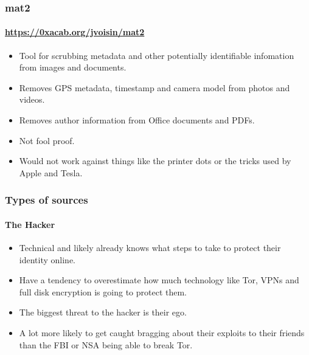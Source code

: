 \documentclass[aspectratio=169,usenames,dvipsnames]{beamer}
\begin{document}
\begin{frame}
  \frametitle{mat2}
  \framesubtitle{\url{https://0xacab.org/jvoisin/mat2}}

  \begin{itemize}[<+->]
    \item Tool for scrubbing metadata and other potentially identifiable
      infomation from images and documents.
    \item Removes GPS metadata, timestamp and camera model from photos and
      videos.
    \item Removes author information from Office documents and PDFs.
    \item Not fool proof.
    \item Would not work against things like the printer dots or the tricks
      used by Apple and Tesla.
  \end{itemize}

\end{frame}
\begin{frame}
  \frametitle{Types of sources}
  \framesubtitle{The Hacker}

  \begin{itemize}[<+->]
    \item Technical and likely already knows what steps to take to protect
      their identity online.
    \item Have a tendency to overestimate how much technology like Tor, VPNs
      and full disk encryption is going to protect them.
    \item The biggest threat to the hacker is their ego.
    \item A lot more likely to get caught bragging about their exploits to
      their friends than the FBI or NSA being able to break Tor.
  \end{itemize}
\end{frame}
\end{document}
